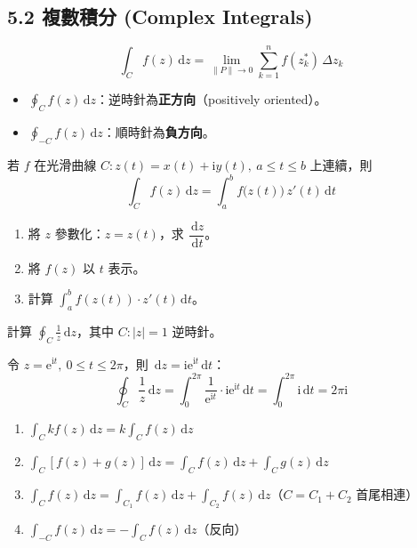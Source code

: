 \documentclass[12pt,a4paper]{article}
\newcommand{\dd}{\,\mathrm{d}}
\newcommand{\ii}{\mathrm{i}}
\newcommand{\ee}{\mathrm{e}}
\begin{document}
\subsection{5.2 複數積分 (Complex Integrals)}

\begin{defbox}[複數積分定義]
$$\int_C f(z)\dd{z} = \lim_{\|P\|\to 0}\sum_{k=1}^n f(z_k^*)\,\Delta z_k$$
\end{defbox}

\begin{itemize}[nosep]
\item $\oint_C f(z)\dd{z}$：逆時針為\textbf{正方向}（positively oriented）。
\item $\displaystyle\oint_{-C} f(z)\dd{z}$：順時針為\textbf{負方向}。
\end{itemize}

\begin{theorembox}
若 $f$ 在光滑曲線 $C: z(t)=x(t)+\ii y(t),\ a\le t\le b$ 上連續，則
$$\int_C f(z)\dd{z} = \int_a^b f\bigl(z(t)\bigr)\,z'(t)\dd{t}$$
\end{theorembox}

\begin{keybox}[計算步驟]
\begin{enumerate}[nosep]
\item 將 $z$ 參數化：$z=z(t)$，求 $\dfrac{\dd{z}}{\dd{t}}$。
\item 將 $f(z)$ 以 $t$ 表示。
\item 計算 $\displaystyle\int_a^b f(z(t))\cdot z'(t)\dd{t}$。
\end{enumerate}
\end{keybox}

\begin{exbox}[典型範例]
計算 $\displaystyle\oint_C \frac{1}{z}\dd{z}$，其中 $C:|z|=1$ 逆時針。

令 $z=\ee^{\ii t},\ 0\le t\le 2\pi$，則 $\dd{z}=\ii\ee^{\ii t}\dd{t}$：
$$\oint_C \frac{1}{z}\dd{z}=\int_0^{2\pi}\frac{1}{\ee^{\ii t}}\cdot\ii\ee^{\ii t}\dd{t}=\int_0^{2\pi}\ii\dd{t}=2\pi\ii$$
\end{exbox}

\begin{theorembox}
\begin{enumerate}[nosep]
\item $\displaystyle\int_C kf(z)\dd{z}=k\int_C f(z)\dd{z}$
\item $\displaystyle\int_C[f(z)+g(z)]\dd{z}=\int_C f(z)\dd{z}+\int_C g(z)\dd{z}$
\item $\displaystyle\int_C f(z)\dd{z}=\int_{C_1}f(z)\dd{z}+\int_{C_2}f(z)\dd{z}$（$C=C_1+C_2$ 首尾相連）
\item $\displaystyle\int_{-C}f(z)\dd{z}=-\int_C f(z)\dd{z}$（反向）
\end{enumerate}
\end{theorembox}
\end{document}
